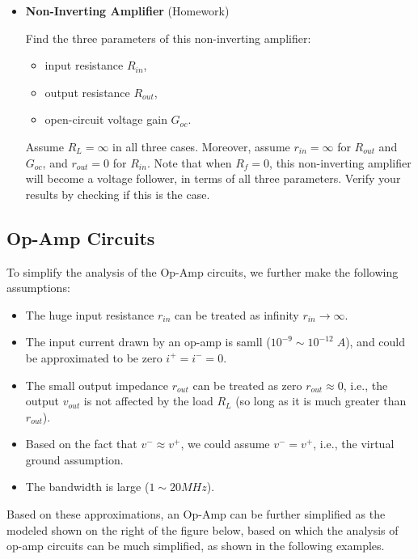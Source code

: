 \begin{itemize}
\item {\bf Non-Inverting Amplifier} (Homework)


  Find the three parameters of this non-inverting amplifier: 
  \begin{itemize}
    \item input resistance $R_{in}$, 
    \item output resistance $R_{out}$, 
    \item open-circuit voltage gain $G_{oc}$. 
  \end{itemize}
  Assume $R_L=\infty$ in all three cases. Moreover, assume $r_{in}=\infty$
  for $R_{out}$ and $G_{oc}$, and $r_{out}=0$ for $R_{in}$.
  Note that when $R_f=0$, this non-inverting amplifier will become a voltage 
  follower, in terms of all three parameters. Verify your results by checking 
  if this is the case.


\end{itemize}


\subsection*{Op-Amp Circuits }


To simplify the analysis of the Op-Amp circuits, we further make the following 
assumptions:
\begin{itemize}
\item The huge input resistance $r_{in}$ can be treated as infinity 
  $r_{in}\rightarrow \infty$.
\item The input current drawn by an op-amp is samll ($10^{-9}\sim10^{-12}\;A$), and 
  could be approximated to be zero $i^+=i^-=0$.
\item The small output impedance $r_{out}$ can be treated as zero $r_{out}\approx 0$,
  i.e., the output $v_{out}$ is not affected by the load $R_L$ (so long as it is
  much greater than $r_{out}$).
\item Based on the fact that $v^-\approx v^+$, we could assume $v^-=v^+$, i.e., 
  the virtual ground assumption.
\item The bandwidth is large ($1 \sim 20MHz$).
\end{itemize}
Based on these approximations, an Op-Amp can be further simplified as the modeled
shown on the right of the figure below, based on which the analysis of op-amp 
circuits can be much simplified, as shown in the following examples.

